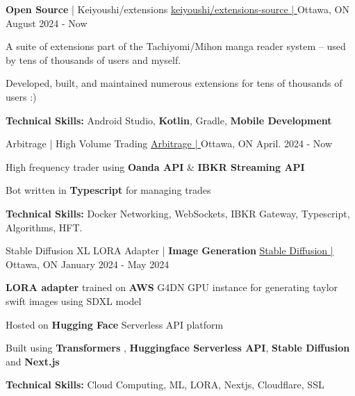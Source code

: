 \begin{cventries}
  \cventry
  {\textbf{Open Source} | Keiyoushi/extensions} %
	{\underline{\href{https://github.com/keiyoushi/extensions-source}{keiyoushi/extensions-source | \ExternalLink}}} %
	{Ottawa, ON} %
	{August 2024 - Now} %
	{
		\begin{cvitems} %
      \item {A suite of extensions part of the Tachiyomi/Mihon manga reader system -- used by tens of thousands of users and myself.}
      \item {Developed, built, and maintained numerous extensions for tens of thousands of users :)}
      \item[] {\textbf{Technical Skills:} Android Studio, \textbf{Kotlin}, Gradle, \textbf{Mobile Development}}
		\end{cvitems}
	}

	\cventry
	{Arbitrage | High Volume Trading}
	{\underline{\href{https://github.com/LefanHu/OARB}{Arbitrage | \ExternalLink}}} %
	{Ottawa, ON} %
	{April. 2024 - Now} %
	{
		\begin{cvitems} %
			\item {High frequency trader using \textbf{Oanda API} \& \textbf{IBKR Streaming API}}
			\item {Bot written in \textbf{Typescript} for managing trades}
			\item {\textbf{Technical Skills:} Docker Networking, WebSockets, IBKR Gateway, Typescript, Algorithms, HFT.}
		\end{cvitems}
	}

	\cventry
	{Stable Diffusion XL LORA Adapter | \textbf{Image Generation}}
	{\underline{\href{https://lefan.ca/projects/stable-diffusion}{Stable Diffusion | \ExternalLink}}} %
	{Ottawa, ON} %
	{January 2024 - May 2024} %
	{
		\begin{cvitems} %
			\item {\textbf{LORA adapter} trained on \textbf{AWS} G4DN GPU instance for generating taylor swift images using SDXL model}
			\item {Hosted on \textbf{Hugging Face} Serverless API platform}
			\item {Built using \textbf{Transformers} , \textbf{Huggingface Serverless API}, \textbf{Stable Diffusion} and \textbf{Next.js}}
			\item {\textbf{Technical Skills:} Cloud Computing, ML, LORA, Nextjs, Cloudflare, SSL}
		\end{cvitems}
	}


\end{cventries}
